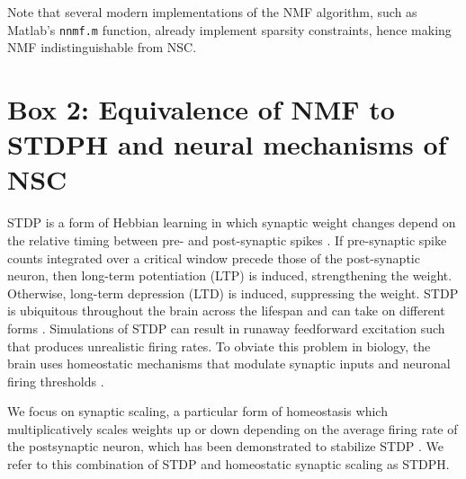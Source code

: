 Note that several modern implementations of the \ac{NMF} algorithm,
such as Matlab's \texttt{nnmf.m} function,
already implement sparsity constraints,
hence making \ac{NMF} indistinguishable from \ac{NSC}.



\section{Box 2: Equivalence of NMF to STDPH and neural mechanisms of NSC}
\label{Box:NMFvSTDPH}


\Acf{STDP} is a form of Hebbian learning in which synaptic weight changes
depend on the relative timing between pre- and post-synaptic spikes \citep{BiPoo1998,SongAbbott2000}. If pre-synaptic spike counts integrated over a critical window precede those of the post-synaptic neuron, then long-term potentiation (LTP) is induced, strengthening the weight. Otherwise, long-term depression (LTD) is induced, suppressing the weight. STDP is ubiquitous throughout the brain across the lifespan and can take on different forms \citep{Caporale2008STDP,Holtmaat2009STDP}. Simulations of \ac{STDP} can result in runaway feedforward excitation such that produces unrealistic firing rates. To obviate this problem in biology, the brain uses homeostatic mechanisms that modulate synaptic inputs and neuronal firing thresholds \citep{Watt2010}.

We focus on synaptic scaling, a particular form of homeostasis which
multiplicatively scales weights up or down
depending on the average firing rate of the postsynaptic neuron, which has
been demonstrated to stabilize \ac{STDP} \citep{Carlson2013,Buonomano2005,VanRossum2000}.
We refer to this combination of \ac{STDP} and homeostatic synaptic scaling
as \ac{STDPH}.


